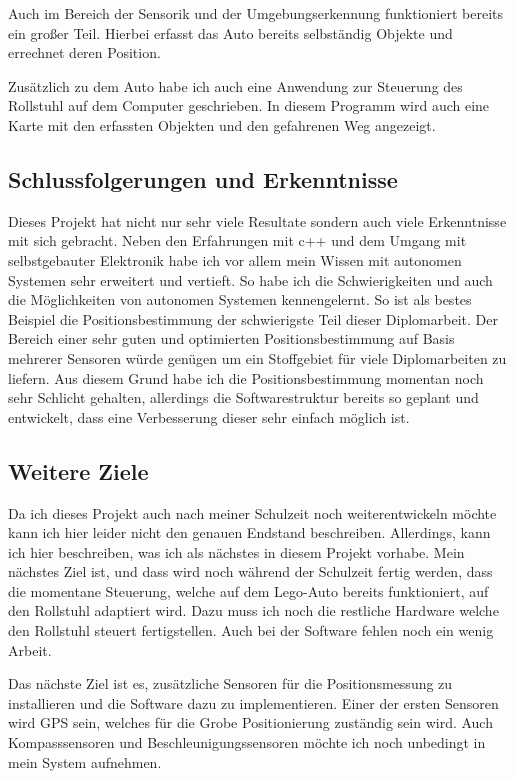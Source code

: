 Auch im Bereich der Sensorik und der Umgebungserkennung funktioniert bereits ein großer Teil.
Hierbei erfasst das Auto bereits selbständig Objekte und errechnet deren Position.

Zusätzlich zu dem Auto habe ich auch eine Anwendung zur Steuerung des Rollstuhl auf dem Computer geschrieben.
In diesem Programm wird auch eine Karte mit den erfassten Objekten und den gefahrenen Weg angezeigt.


\subsection{Schlussfolgerungen und Erkenntnisse}
Dieses Projekt hat nicht nur sehr viele Resultate sondern auch viele Erkenntnisse mit sich gebracht.
Neben den Erfahrungen mit c++ und dem Umgang mit selbstgebauter Elektronik habe ich vor allem mein Wissen mit autonomen Systemen sehr erweitert und vertieft.
So habe ich die Schwierigkeiten und auch die Möglichkeiten von autonomen Systemen kennengelernt.
So ist als bestes Beispiel die Positionsbestimmung der schwierigste Teil dieser Diplomarbeit.
Der Bereich einer sehr guten und optimierten Positionsbestimmung auf Basis mehrerer Sensoren würde genügen um ein Stoffgebiet für viele Diplomarbeiten zu liefern.
Aus diesem Grund habe ich die Positionsbestimmung momentan noch sehr Schlicht gehalten, allerdings die Softwarestruktur bereits so geplant und entwickelt, dass eine Verbesserung dieser sehr einfach möglich ist.


\subsection{Weitere Ziele}
Da ich dieses Projekt auch nach meiner Schulzeit noch weiterentwickeln möchte kann ich hier leider nicht den genauen Endstand beschreiben.
Allerdings, kann ich hier beschreiben, was ich als nächstes in diesem Projekt vorhabe.
Mein nächstes Ziel ist, und dass wird noch während der Schulzeit fertig werden, dass die momentane Steuerung, welche auf dem Lego-Auto bereits funktioniert, auf den Rollstuhl adaptiert wird.
Dazu muss ich noch die restliche Hardware welche den Rollstuhl steuert fertigstellen.
Auch bei der Software fehlen noch ein wenig Arbeit.

Das nächste Ziel ist es, zusätzliche Sensoren für die Positionsmessung zu installieren und die Software dazu zu implementieren.
Einer der ersten Sensoren wird GPS sein, welches für die Grobe Positionierung zuständig sein wird.
Auch Kompasssensoren und Beschleunigungssensoren möchte ich noch unbedingt in mein System aufnehmen.

